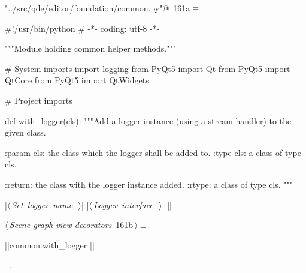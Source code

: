 \documentclass[%
    a4paper,    %
    justified,  %
    nobib,      %
    openany     %
]{tufte-book}
\begin{document}
\begin{flushleft} \small
\begin{minipage}{\linewidth}\label{scrap176}\raggedright\small
{} \verb@"../src/qde/editor/foundation/common.py"@\nobreak\ {\footnotesize {161a}}$\equiv$
\vspace{-1ex}
\begin{pythoncode}
#!/usr/bin/python
# -*- coding: utf-8 -*-

"""Module holding common helper methods."""

# System imports
import logging
from PyQt5 import Qt
from PyQt5 import QtCore
from PyQt5 import QtWidgets

# Project imports


def with_logger(cls):
    """Add a logger instance (using a stream handler) to the given class.

    :param cls: the class which the logger shall be added to.
    :type  cls: a class of type cls.

    :return: the class with the logger instance added.
    :rtype:  a class of type cls.
    """

    |\hbox{$\langle\,${\itshape Set logger name}\nobreak\ {\footnotesize {}}$\,\rangle$}|
    |\hbox{$\langle\,${\itshape Logger interface}\nobreak\ {\footnotesize {}}$\,\rangle$}|
|\NWsep|
\end{pythoncode}
\vspace{1.5ex}
\footnotesize
\begin{list}{}{\setlength{\itemsep}{-\parsep}\setlength{\itemindent}{-\leftmargin}}

\item{}
\end{list}
\end{minipage}\vspace{4ex}
\end{flushleft}
\begin{flushleft} \small
\begin{minipage}{\linewidth}\label{scrap177}\raggedright\small
{} $\langle\,${\itshape Scene graph view decorators}\nobreak\ {\footnotesize {161b}}$\,\rangle\equiv$
\vspace{-1ex}
\begin{pythoncode}
|\normalfont{}\fontfamily{}|common.with_logger
|\NWsep|
\end{pythoncode}
\vspace{1.5ex}
\footnotesize
\begin{list}{}{\setlength{\itemsep}{-\parsep}\setlength{\itemindent}{-\leftmargin}}
\item \NWtxtMacroRefIn\ .

\item{}
\end{list}
\end{minipage}\vspace{4ex}
\end{flushleft}
\end{document}
